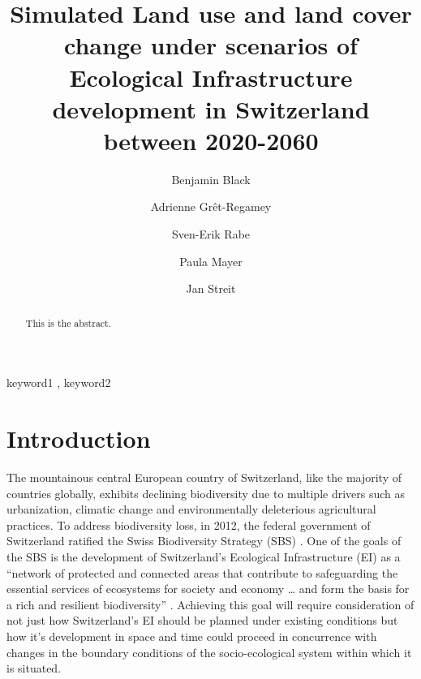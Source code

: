 \documentclass[
  authoryear,
  preprint,
  onecolumn]{elsarticle}
\begin{document}
\begin{frontmatter}
\title{Simulated Land use and land cover change under scenarios of
Ecological Infrastructure development in Switzerland between 2020-2060}
\author[1]{Benjamin Black%
%
}
\author[1]{Adrienne Grêt-Regamey%
%
}
\author[1]{Sven-Erik Rabe%
%
}
\author[1]{Paula Mayer%
%
}
\author[1]{Jan Streit%
%
}








\begin{abstract}
This is the abstract.
\end{abstract}





\begin{keyword}
    keyword1 \sep
    keyword2
\end{keyword}
\end{frontmatter}
    \ifdefined\Shaded\renewenvironment{Shaded}{\begin{tcolorbox}[breakable, interior hidden, sharp corners, frame hidden, boxrule=0pt, borderline west={3pt}{0pt}{shadecolor}, enhanced]}{\end{tcolorbox}}\fi


\hypertarget{introduction}{%
\section{Introduction}\label{introduction}}

The mountainous central European country of Switzerland, like the
majority of countries globally, exhibits declining biodiversity due to
multiple drivers such as urbanization, climatic change and
environmentally deleterious agricultural practices. To address
biodiversity loss, in 2012, the federal government of Switzerland
ratified the Swiss Biodiversity Strategy (SBS) \citet{swissbi2012} . One
of the goals of the SBS is the development of Switzerland's Ecological
Infrastructure (EI) as a ``network of protected and connected areas that
contribute to safeguarding the essential services of ecosystems for
society and economy \ldots{} and form the basis for a rich and resilient
biodiversity'' \citet{federalofficefortheenvironment}. Achieving this
goal will require consideration of not just how Switzerland's EI should
be planned under existing conditions but how it's development in space
and time could proceed in concurrence with changes in the boundary
conditions of the socio-ecological system within which it is situated.
\end{document}
